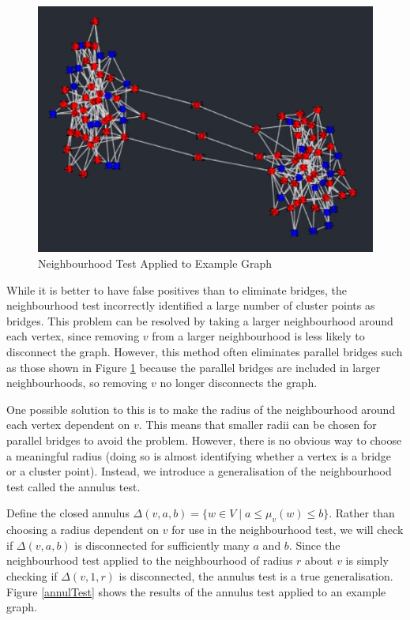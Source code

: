 \documentclass[12pt,a4paper]{amsart}
\numberwithin{equation}{section}
\def\D{\Delta}
\theoremstyle{plain}
\theoremstyle{definition}
\begin{document}
\begin{figure}[h]
	\centering
	\includegraphics[scale=0.8]{NeighbourhoodTest.jpg}
	\caption{Neighbourhood Test Applied to Example Graph}
	\label{nbhdTest}
\end{figure}

While it is better to have false positives than to eliminate bridges, the neighbourhood test incorrectly identified a large number of cluster points as bridges. This problem can be resolved by taking a larger neighbourhood around each vertex, since removing $v$ from a larger neighbourhood is less likely to disconnect the graph. However, this method often eliminates parallel bridges such as those shown in Figure \ref{nbhdTest} because the parallel bridges are included in larger neighbourhoods, so removing $v$ no longer disconnects the graph.

One possible solution to this is to make the radius of the neighbourhood around each vertex dependent on $v$. This means that smaller radii can be chosen for parallel bridges to avoid the problem. However, there is no obvious way to choose a meaningful radius (doing so is almost identifying whether a vertex is a bridge or a cluster point). Instead, we introduce a generalisation of the neighbourhood test called the annulus test. 

Define the closed annulus $\D(v,a,b) = \{w \in V \mid a \leq \mu_v(w) \leq b\}$. Rather than choosing a radius dependent on $v$ for use in the neighbourhood test, we will check if $\D(v,a,b)$ is disconnected for sufficiently many $a$ and $b$. Since the neighbourhood test applied to the neighbourhood of radius $r$ about $v$ is simply checking if $\D(v,1,r)$ is disconnected, the annulus test is a true generalisation. Figure \ref{annulTest} shows the results of the annulus test applied to an example graph.
\end{document}
